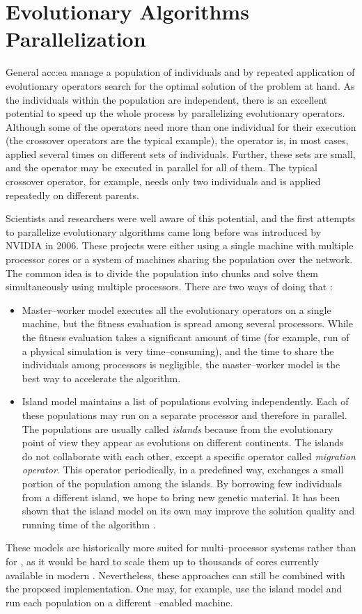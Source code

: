 \section{Evolutionary Algorithms Parallelization}

General \acrlong{acc:ea} manage a population of individuals and by repeated application of evolutionary operators search for the optimal solution of the problem at hand. As the individuals within the population are independent, there is an excellent potential to speed up the whole process by parallelizing evolutionary operators. Although some of the operators need more than one individual for their execution (the crossover operators are the typical example), the operator is, in most cases, applied several times on different sets of individuals. Further, these sets are small, and the operator may be executed in parallel for all of them. The typical crossover operator, for example, needs only two individuals and is applied repeatedly on different parents.

Scientists and researchers were well aware of this potential, and the first attempts \citep{PGAPack} to parallelize evolutionary algorithms came long before \cuda was introduced by NVIDIA in 2006. These projects were either using a single machine with multiple processor cores or a system of machines sharing the population over the network. The common idea is to divide the population into chunks and solve them simultaneously using multiple processors. There are two ways of doing that \citep{CHENG2019514}:
\begin{itemize}
    \item Master--worker model executes all the evolutionary operators on a single machine, but the fitness evaluation is spread among several processors. While the fitness evaluation takes a significant amount of time (for example, run of a physical simulation is very time--consuming), and the time to share the individuals among processors is negligible, the master--worker model is the best way to accelerate the algorithm.
    \item Island model maintains a list of populations evolving independently. Each of these populations may run on a separate processor and therefore in parallel. The populations are usually called \emph{islands} because from the evolutionary point of view they appear as evolutions on different continents. The islands do not collaborate with each other, except a specific operator called \emph{migration operator}. This operator periodically, in a predefined way, exchanges a small portion of the population among the islands. By borrowing few individuals from a different island, we hope to bring new genetic material. It has been shown that the island model on its own may improve the solution quality and running time of the algorithm \citep{IslandModel}.
\end{itemize}
These models are historically more suited for multi--processor systems rather than for \gpuns, as it would be hard to scale them up to thousands of cores currently available in modern \gpuns. Nevertheless, these approaches can still be combined with the proposed implementation. One may, for example, use the island model and run each population on a different \gpuns--enabled machine.


